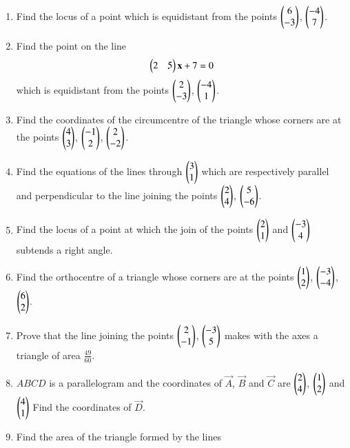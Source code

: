 \renewcommand{\theequation}{\theenumi}
\begin{enumerate}[label=\arabic*.,ref=\thesubsection.\theenumi]
\item Find the locus of a point which is equidistant from the points $\begin{pmatrix}6\\-3\end{pmatrix}$, $\begin{pmatrix}-4\\7\end{pmatrix}$.
\item Find the point on the line
\begin{align}
\begin{pmatrix}2 & 5\end{pmatrix}\mathbf{x}+7=0
\end{align}
which is equidistant from the points $\begin{pmatrix}2\\-3\end{pmatrix}$, $\begin{pmatrix}-4\\1\end{pmatrix}$.
\item Find the coordinates of the circumcentre of the triangle whose corners are at the points $\begin{pmatrix}4\\3\end{pmatrix}$, $\begin{pmatrix}-1\\2\end{pmatrix}$, $\begin{pmatrix}2\\-2\end{pmatrix}$.
\item Find the equations of the lines through $\begin{pmatrix}3\\1\end{pmatrix}$ which are respectively parallel and perpendicular to the line joining the points $\begin{pmatrix}2\\4\end{pmatrix}$, $\begin{pmatrix}5\\-6\end{pmatrix}$.
\item Find the locus of a point at which the join of the points $\begin{pmatrix}2\\1\end{pmatrix}$ and $\begin{pmatrix}-3\\4\end{pmatrix}$ subtends a right angle.
\item Find the orthocentre of a triangle whose corners are at the points $\begin{pmatrix}1\\2\end{pmatrix}$, $\begin{pmatrix}-3\\-4\end{pmatrix}$, $\begin{pmatrix}6\\2\end{pmatrix}$.
\item Prove that the line joining the points $\begin{pmatrix}2\\-1\end{pmatrix}$, $\begin{pmatrix}-3\\5\end{pmatrix}$ makes with the axes a triangle of area $\frac{49}{60}$.
\item $ABCD$ is a parallelogram and the coordinates of $\vec{A}$, $\vec{B}$ and $\vec{C}$ are $\begin{pmatrix}2\\4\end{pmatrix}$, $\begin{pmatrix}1\\2\end{pmatrix}$ and $\begin{pmatrix}4\\1\end{pmatrix}$ Find the coordinates of $\vec{D}$.
\item Find the area of the triangle formed by the lines 

\end{enumerate}

